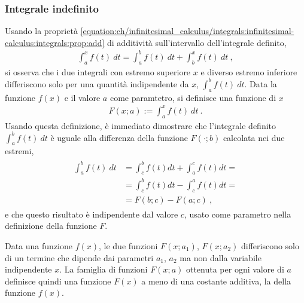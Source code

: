 \documentclass[letterpaper,10pt,english]{jupyterBook}
\begin{document}
\subsubsection{Integrale indefinito}
\label{\detokenize{ch/infinitesimal_calculus/integrals:integrale-indefinito}}
\sphinxAtStartPar
Usando la proprietà \eqref{equation:ch/infinitesimal_calculus/integrals:infinitesimal-calculus:integrals:prop:add} di additività sull’intervallo dell’integrale definito,
\begin{equation*}
\begin{split}\int_a^x f(t) \ dt = \int_a^b f(t) \ dt + \int_b^x f(t) \ dt \ , \end{split}
\end{equation*}
\sphinxAtStartPar
si osserva che i due integrali con estremo superiore \(x\) e diverso estremo inferiore differiscono solo per una quantità indipendente da \(x\), \(\int_{a}^{b} f(t) \ dt\). Data la funzione \(f(x)\) e il valore \(a\) come paramtetro, si definisce una funzione di \(x\)
\begin{equation}\label{equation:ch/infinitesimal_calculus/integrals:infinitesimal-calculus:integrals:primi-}
\begin{split}F(x;a) := \int_a^x f(t) \ dt \ .\end{split}
\end{equation}
\sphinxAtStartPar
Usando questa definizione, è immediato dimostrare che l’integrale definito \(\int_{a}^{b} f(t) \ dt\) è uguale alla differenza della funzione \(F(\cdot; b)\) calcolata nei due estremi,
\begin{equation*}
\begin{split}\begin{aligned}
  \int_{a}^{b} f(t) \ dt & = \int_{c}^{b} f(t) dt + \int_{a}^{c} f(t) dt = \\ 
                         & = \int_{c}^{b} f(t) dt - \int_{c}^{a} f(t) dt = \\
                         & = F(b;c) - F(a;c) \ ,
\end{aligned}\end{split}
\end{equation*}
\sphinxAtStartPar
e che questo risultato è indipendente dal valore \(c\), usato come parametro nella definizione della funzione \(F\).

\sphinxAtStartPar
Data una funzione \(f(x)\), le due funzioni \(F(x;a_1)\), \(F(x;a_2)\) differiscono solo di un termine che dipende dai parametri \(a_1\), \(a_2\) ma non dalla variabile indipendente \(x\). La famiglia di funzioni \(F(x;a)\) ottenuta per ogni valore di \(a\) definisce quindi una funzione \(F(x)\) a meno di una costante additiva, la  della funzione \(f(x)\).
\end{document}

